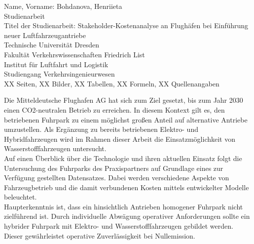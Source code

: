 \newpage
\thispagestyle{empty}
\begin{minipage}[\textheight]{145mm}

\vspace{10mm}

Name, Vorname: Bohdanova, Henriieta\\
Studienarbeit\\

Titel der Studienarbeit: Stakeholder-Kostenanalyse an Flughäfen bei Einführung neuer Luftfahrzeugantriebe\\

Technische Universität Dresden\\
Fakultät Verkehrswissenschaften \glqq Friedrich List\grqq{}\\
Institut für Luftfahrt und Logistik\\

Studiengang Verkehrsingenieurwesen\\
XX Seiten, XX Bilder, XX Tabellen, XX Formeln, XX Quellenangaben 
		
\vspace{15mm}

\begin{minipage}[\textheight]{145mm}
 
\vspace{10mm}

Die Mitteldeutsche Flughafen AG hat sich zum Ziel gesetzt, bis zum Jahr 2030 einen \acs{CO2}-neutralen Betrieb zu erreichen. In diesem Kontext gilt es, den betriebenen Fuhrpark zu einem möglichst großen Anteil auf alternative Antriebe umzustellen. Als Ergänzung zu bereits betriebenen Elektro- und Hybridfahrzeugen
wird im Rahmen dieser Arbeit die Einsatzmöglichkeit von Wasserstofffahrzeugen untersucht.\\
Auf einen Überblick über die Technologie und ihren aktuellen Einsatz folgt die Untersuchung des Fuhrparks des Praxispartners auf Grundlage eines zur Verfügung gestellten Datensatzes. Dabei werden verschiedene Aspekte von Fahrzeugbetrieb und die damit verbundenen Kosten mittels entwickelter Modelle beleuchtet.\\
Haupterkenntnis ist, dass ein hinsichtlich Antrieben homogener Fuhrpark nicht zielführend ist. Durch individuelle Abwägung operativer Anforderungen sollte ein hybrider Fuhrpark mit Elektro- und Wasserstofffahrzeugen gebildet werden. Dieser gewährleistet operative Zuverlässigkeit bei Nullemission. 
\end{minipage}\hspace{4cm}



\end{minipage}
\cleardoublepage